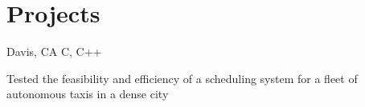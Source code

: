 \documentclass[letterpaper]{simjega-resume}
\begin{document}
%


\section{Projects}
\jgsectionline










{Davis, CA}
{} %
{C, C++}
{\begin{tightitemize}
\item[] Tested the feasibility and efficiency of a scheduling system for a fleet of autonomous taxis in a dense city
\end{tightitemize}}

\end{document}

